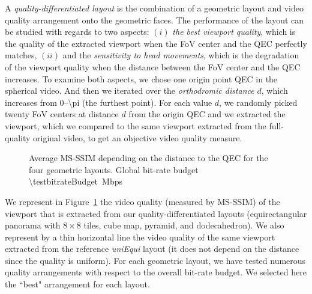 
A \textit{quality-differentiated layout} is the combination of a
geometric layout and video quality arrangement onto the geometric
faces. The performance of the layout can be studied with regards to
two aspects: $(i)$ \emph{the best viewport quality}, which is the
quality of the extracted viewport when the \ac{FoV} center and the
\ac{QEC} perfectly matches, $(ii)$ and the \emph{sensitivity to head
movements}, which is the degradation of the viewport quality when the
distance between the FoV center and the \ac{QEC} increases. To examine
both aspects, we chose one origin point \ac{QEC} in the spherical
video. And then we iterated over the \emph{orthodromic distance} $d$,
which increases from \numrange{0}{\pi} (the furthest point). For each
value $d$, we randomly picked twenty \ac{FoV} centers at distance $d$
from the origin \ac{QEC} and we extracted the viewport, which we
compared to the same viewport extracted from the full-quality original
video, to get an objective video quality measure.

\begin{figure}
    
       \caption{Average \acs{MS-SSIM} depending on the distance to the \acs{QEC} for the four geometric layouts. Global bit-rate budget \SI{\testbitrateBudget}{\mega bps}}
    \label{fig:dist_quality_psnr}
\end{figure}


We represent in Figure~\ref{fig:dist_quality_psnr} the video quality
(measured by \acs{MS-SSIM}) of the viewport that is extracted from our
quality-differentiated layouts (equirectangular panorama with
$8\!\times\! 8$ tiles, cube map, pyramid, and dodecahedron). We also
represent by a thin horizontal line the video quality of the same
viewport extracted from the reference \textit{uniEqui} layout (it does
not depend on the distance since the quality is uniform). For each
geometric layout, we have tested numerous quality arrangements with
respect to the overall bit-rate budget. We selected here the ``best"
arrangement for each layout.

